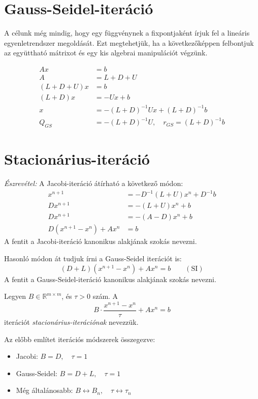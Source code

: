 \section{Gauss-Seidel-iteráció}
A célunk még mindig, hogy egy függvénynek a fixpontjaként írjuk fel a lineáris egyenletrendszer megoldását. Ezt megtehetjük, ha a következőképpen felbontjuk az együttható mátrixot és egy kis algebrai manipulációt végzünk.

\begin{align*}
Ax & = b \\
A & = L + D + U \\
(L+D+U)x & = b \\
(L+D)x & = -Ux + b \\
x & = -(L+D)^{-1}Ux + (L+D)^{-1}b \\
Q_{GS} & = -(L+D)^{-1}U, \quad r_{GS} = (L+D)^{-1}b
\end{align*}

\section{Stacionárius-iteráció}
\textit{Észrevétel:} A Jacobi-iteráció átírható a következő módon:
\begin{align*}
    x^{n+1} & = -D^{-1}(L+U)x^{n} + D^{-1}b \\
    Dx^{n+1} & = - (L+U)x^{n} + b \\
    Dx^{n+1} & = -(A - D)x^{n} + b \\
    D(x^{n+1} - x^{n}) + Ax^{n} & = b
\end{align*}
A fentit a Jacobi-iteráció kanonikus alakjának szokás nevezni.

Hasonló módon át tudjuk írni a Gauss-Seidel iterációt is:
\begin{equation*}
    (D+L)(x^{n+1}-x^{n})+Ax^{n}=b \quad \quad (\text{SI})
\end{equation*}
A fentit a Gauss-Seidel-iteráció kanonikus alakjának szokás nevezni.

\begin{definition}
    Legyen $B \in \mathbb{R}^{m\times m}$, és $\tau > 0$ szám. A
    \begin{equation*}
        B \cdot \frac{x^{n+1}-x^{n}}{\tau} + Ax^{n} = b
    \end{equation*}
iterációt \textit{stacionárius-iterációnak} nevezzük.
\end{definition}

\begin{megj}
    Az előbb említet iterációs módszerek összegezve:
    \begin{itemize}
        \item Jacobi: $B = D, \quad \tau = 1$
        \item Gauss-Seidel: $B = D + L, \quad \tau = 1$
        \item Még általánosabb: $B \leftrightarrow B_{n}, \quad \tau \leftrightarrow \tau_{n}$
    \end{itemize}
\end{megj}

